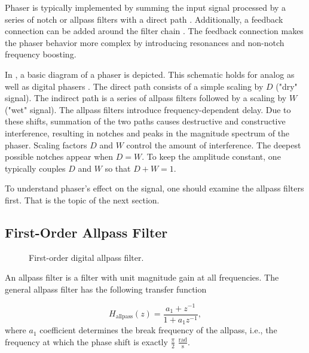Phaser is typically implemented by summing the input signal processed by a series of notch or allpass filters with a direct path \cite{Zoelzer2011}. Additionally, a feedback connection can be added around the filter chain \cite{Kiiski2016}. The feedback connection makes the phaser behavior more complex by introducing resonances and non-notch frequency boosting.

In , a basic diagram of a phaser is depicted. This schematic holds for analog as well as digital phasers \cite{PASPWEB2010}. The direct path consists of a simple scaling by $D$ ("dry" signal). The indirect path is a series of allpass filters followed by a scaling by $W$ ("wet" signal). The allpass filters introduce frequency-dependent delay. Due to these shifts, summation of the two paths causes destructive and constructive interference, resulting in notches and peaks in the magnitude spectrum of the phaser. Scaling factors $D$ and $W$ control the amount of interference. The deepest possible notches appear when $D = W$. To keep the amplitude constant, one typically couples $D$ and $W$ so that $D + W = 1$.

To understand phaser's effect on the signal, one should examine the allpass filters first. That is the topic of the next section.


\subsection{First-Order Allpass Filter}
\label{sec:first_order_allpass_filter}
\begin{figure}
    \centering
    
    \caption{First-order digital allpass filter.}
    \label{fig:first_order_allpass_filter}
\end{figure}

An allpass filter is a filter with unit magnitude gain at all frequencies. The general allpass filter has the following transfer function

\begin{equation}
    H_\text{allpass}(z) = \frac{a_1 + z^{-1}}{1 + a_1 z^{-1}},
\end{equation}
where $a_1$ coefficient determines the break frequency of the allpass, i.e., the frequency at which the phase shift is exactly $\frac{\pi}{2}$ $\frac{\text{rad}}{\text{s}}$.


